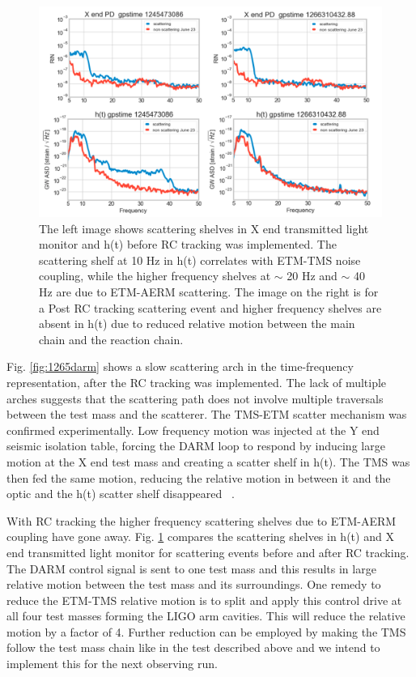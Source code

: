 \documentclass[12pt]{iopart}
\begin{document}
\begin{figure}[h]
    \centering
    \includegraphics[width=\textwidth]{etm-transmon.png}
    \caption{The left image shows scattering shelves in X end transmitted light monitor and h(t) before RC tracking was implemented. The scattering shelf at 10 Hz in h(t) correlates with ETM-TMS noise coupling, while the higher frequency shelves at $\sim$ 20 Hz and $\sim$ 40 Hz are due to ETM-AERM scattering. The image on the right is for a Post RC tracking scattering event and higher frequency shelves are absent in h(t) due to reduced relative motion between the main chain and the reaction chain.}
    \label{fig:etm-transmon}
\end{figure}

\par
Fig. \ref{fig:1265darm} shows a slow scattering arch in the time-frequency representation, after the RC tracking was implemented. The lack of multiple arches suggests that the scattering path does not involve multiple traversals between the test mass and the scatterer. The TMS-ETM scatter mechanism was confirmed experimentally. Low frequency motion was injected at the Y end seismic isolation table, forcing the DARM loop to respond by inducing large motion at the X end test mass and creating a scatter shelf in h(t). The TMS was then fed the same motion, reducing the relative motion in between it and the optic and the h(t) scatter shelf disappeared ~\cite{alogae_tmsx,alogsid_tmsx,Heijningen:2018evm}.

 With RC tracking the higher frequency scattering shelves due to ETM-AERM coupling have gone away. Fig. \ref{fig:etm-transmon} compares the scattering shelves in h(t) and X end transmitted light monitor for scattering events before and after RC tracking. The DARM control signal is sent to one test mass and this results in large relative motion between the test mass and its surroundings. One remedy to reduce the ETM-TMS relative motion is to split and apply this control drive at all four test masses forming the LIGO arm cavities. This will reduce the relative motion by a factor of 4. Further reduction can be employed by making the TMS follow the test mass chain like in the test described above and we intend to implement this for the next observing run.
\end{document}

